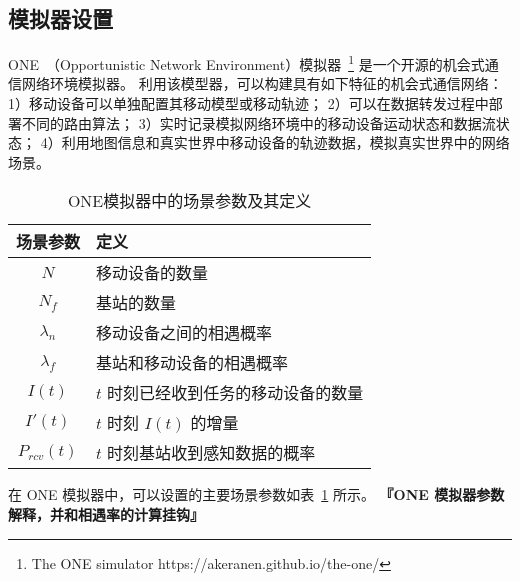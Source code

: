 \subsection{模拟器设置}
ONE~（Opportunistic Network Environment）模拟器~\footnote{The ONE simulator https://akeranen.github.io/the-one/} 是一个开源的机会式通信网络环境模拟器。
利用该模型器，可以构建具有如下特征的机会式通信网络：
1）移动设备可以单独配置其移动模型或移动轨迹；
2）可以在数据转发过程中部署不同的路由算法；
3）实时记录模拟网络环境中的移动设备运动状态和数据流状态；
4）利用地图信息和真实世界中移动设备的轨迹数据，模拟真实世界中的网络场景。

\begin{table}[h]
  \vspace{-0.5em}
  \caption{ONE模拟器中的场景参数及其定义}
  \vspace{-0.5em}
  \centering
  \label{table_notations_ONE}
  \begin{tabular}{|c|p{7cm}|}
  \hline
  \textbf{场景参数} & \textbf{定义}\\
  \hline
  $N$ & 移动设备的数量\\\hline
  $N_f$ & 基站的数量\\\hline
  $\lambda_n$ & 移动设备之间的相遇概率\\\hline
  $\lambda_f$ & 基站和移动设备的相遇概率\\\hline
  $I(t)$ & $t$ 时刻已经收到任务的移动设备的数量\\\hline
  $I'(t)$ & $t$ 时刻 $I(t)$ 的增量\\\hline
  $P_{rcv}(t)$ & $t$ 时刻基站收到感知数据的概率\\\hline
  \end{tabular}
  \vspace{-1em}
\end{table}

在 ONE 模拟器中，可以设置的主要场景参数如表~\ref{table_notations_ONE} 所示。
\textbf{『ONE 模拟器参数解释，并和相遇率的计算挂钩』}

